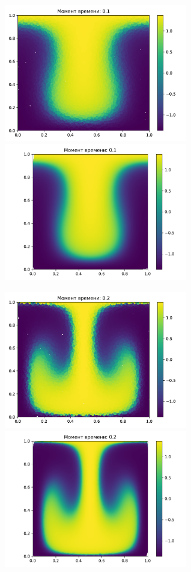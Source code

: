     \begin{figure}[H]
        \centering
        \includegraphics[width=8cm]{pictures/s5.png}
        \includegraphics[width=8cm]{pictures/p5.pdf}
    \end{figure}
    \begin{figure}[H]
        \centering
        \includegraphics[width=8cm]{pictures/s10.png}
        \includegraphics[width=8cm]{pictures/p10.pdf}
    \end{figure}
